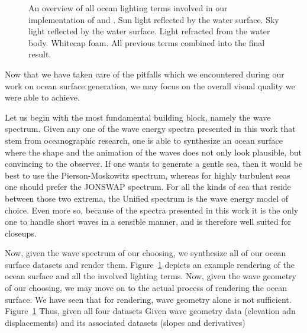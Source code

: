 \begin{figure}
{	\label{fig:results:complete}
 }
\caption[An overview of all ocean lighting terms involved in our implementation.]{
An overview of all ocean lighting terms involved in our implementation
of \citet{article:oceanlighting,misc:oceanlightingfft} and \citet{article:whitecaps}.
 Sun light reflected by the water surface.
 Sky light reflected by the water surface.
 Light refracted from the water body.
 Whitecap foam.
 All previous terms combined into the final
result.
}
\label{fig:results}
\end{figure}
%
Now that we have taken care of the pitfalls which we encountered during
our work on ocean surface generation, we may focus on the overall visual
quality we were able to achieve.

Let us begin with the most fundamental building block, namely the wave spectrum.
Given any one of the wave energy spectra presented in this work
that stem from oceanographic research, one is able to synthesize an ocean
surface where the shape and the animation of the waves does
not only look plausible, but convincing to the observer.
If one wants to generate a gentle sea, then it would be
best to use the Pierson-Moskowitz spectrum, whereas for highly turbulent seas
one should prefer the JONSWAP spectrum. For all the kinds of sea that reside
between those two extrema, the Unified spectrum is the wave energy model of
choice. Even more so, because of the spectra presented in this work it is the
only one to handle short waves in a sensible manner, and is therefore well
suited for closeups. 


Now, given the wave spectrum of our choosing, we synthesize all of our
ocean surface datasets and render them. Figure~\ref{fig:results} depicts
an example rendering of the ocean surface and all the involved lighting
terms.
Now, given the wave geometry of our choosing, we may move on to the actual
process of rendering the ocean surface.
We have seen that for rendering, wave geometry alone is not sufficient.
Figure~\ref{fig:results}
Thus, given all four datasets 
Given wave geometry data (elevation adn displacements) and its associated datasets
(slopes and derivatives)


